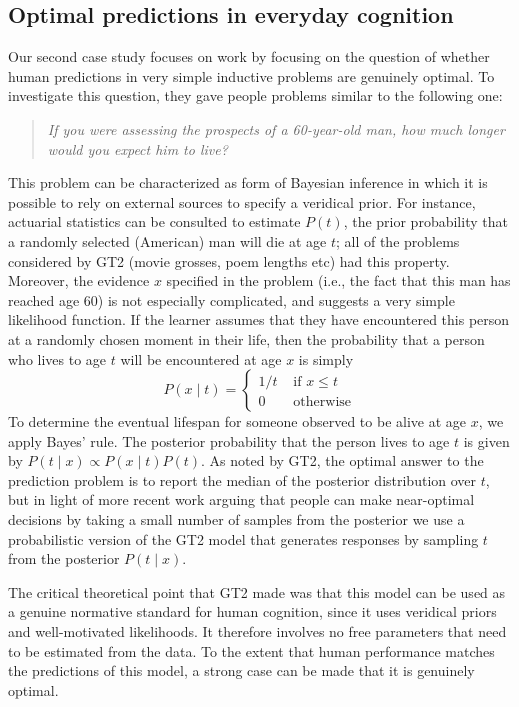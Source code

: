 \documentclass[doc,floatsintext]{apa6}
\begin{document}
\subsection*{Optimal predictions in everyday cognition}

Our second case study focuses on work by  focusing on the question of whether human predictions in very simple inductive problems are genuinely optimal. To investigate this question, they gave people problems similar to the following one:
\begin{quote}
{\it If you were assessing the prospects of a 60-year-old man, how much longer would you expect him to live?}
\end{quote}
This problem can be characterized as form of Bayesian inference in which it is possible to rely on external sources to specify a veridical prior. For instance, actuarial statistics can be consulted to estimate $P(t)$, the prior probability that a randomly selected (American) man will die at age $t$; all of the problems considered by GT2 (movie grosses, poem lengths etc) had this property. Moreover, the evidence $x$ specified in the problem (i.e., the fact that this man has reached age 60) is not especially complicated, and suggests a very simple likelihood function. If the learner assumes that they have encountered this person at a randomly chosen moment in their life, then the probability that a person who lives to age $t$ will be encountered at age $x$ is simply
\begin{equation}
P(x \mid t) = \left\{ \begin{array}{rl} 1/t & \mbox{ if } x\leq t \\
0 & \mbox{ otherwise} \end{array} \right.
\end{equation}
To determine the eventual lifespan for someone observed to be alive at age $x$, we apply Bayes' rule. The posterior probability that the person lives to age $t$ is given by
$
P( t \mid x ) \propto P(x \mid t) P(t)
$.
As noted by GT2, the optimal answer to the prediction problem is to report the median of the posterior distribution over $t$, but in light of more recent work arguing that people can make near-optimal decisions by taking a small number of samples from the posterior \cite{vul_one_2014} we use a probabilistic version of the GT2 model that generates responses by sampling $t$ from the posterior $P(t \mid x)$.

The critical theoretical point that GT2 made was that this model can be used as a genuine normative standard for human cognition, since it uses veridical priors and well-motivated likelihoods. It therefore involves no free parameters that need to be estimated from the data. To the extent that human performance matches the predictions of this model, a strong case can be made that it is genuinely optimal.
\end{document}
